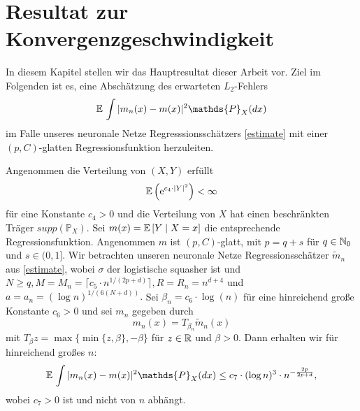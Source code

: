 \chapter{Resultat zur Konvergenzgeschwindigkeit}
\label{chap:3}

In diesem Kapitel stellen wir das Hauptresultat dieser Arbeit vor.
Ziel im Folgenden ist es, eine Abschätzung des erwarteten $L_2$-Fehlers 
$$\E \int |m_n(x) - m(x)|^2  \mathds{P}_X(dx)$$
im Falle unseres neuronale Netze Regresssionsschätzers \ref{estimate} mit einer $(p,C)$-glatten Regressionsfunktion herzuleiten.

\begin{thm}\label{optstop}
Angenommen die Verteilung von $(X,Y)$ erfüllt 
$$ \mathbb{E}\,\Big(\mathrm{e}^{c_4 \cdot |Y|^2}\Big) < \infty$$
für eine Konstante $c_4 > 0$ und die Verteilung von $X$ hat einen beschränkten Träger $supp(\mathds{P}_X)$. Sei $m(x) = \mathbb{E}\,[Y \mid X = x]$ die entsprechende Regressionsfunktion. 
Angenommen $m$ ist $(p,C)$-glatt, mit $p = q + s$ für $q \in \mathbb{N}_0$ und $s \in (0,1].$ Wir betrachten unseren neuronale Netze Regressionsschätzer $\tilde{m}_n$ aus \ref{estimate}, wobei $\sigma$ der logistische squasher ist und $N \geq q, M = M_n = \lceil c_5 \cdot n^{1/(2p + d)}\rceil, R = R_n = n^{d + 4}$ und $a = a_n = (\log n)^{1/(6(N + d))}.$
Sei $\beta_n = c_6 \cdot \log(n)$ für eine hinreichend große Konstante $c_6 > 0$ und sei $m_n$ gegeben durch
$$m_n(x) = T_{\beta_n}\tilde{m}_n (x)$$
mit $T_{\beta}z = \max\{\min\{z, \beta\}, -\beta\}$ für $z \in \mathbb{R}$ und $\beta > 0.$ Dann erhalten wir für hinreichend großes $n$:
$$\E \int |m_n(x) - m(x)|^2  \mathds{P}_X(dx) \leq c_7 \cdot (\log n)^3 \cdot n^{- \frac{2p}{2p + d}},$$
wobei $c_7 > 0$ ist und nicht von $n$ abhängt.
\end{thm}
